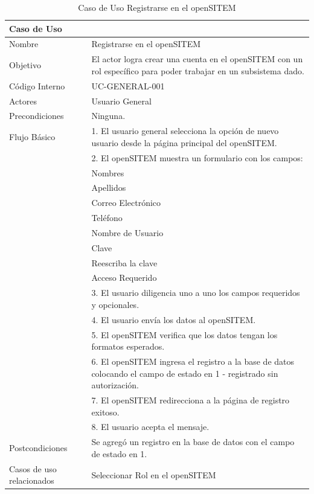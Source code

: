 \begin{table}
\begin{center}
\begin{tabular}{|l|p{10cm}|}
\hline
\textbf{Caso de Uso}&\\
\hline
Nombre & Registrarse en el openSITEM\\
\hline
Objetivo & El actor logra crear una cuenta en el openSITEM con un rol específico para poder trabajar en un subsistema dado.\\
\hline
Código Interno & UC-GENERAL-001 \\
\hline
Actores & Usuario General\\
\hline
Precondiciones & Ninguna.\\
\hline
Flujo Básico & 1. El usuario general selecciona la opción de nuevo usuario desde la página principal del openSITEM.\\
& 2. El openSITEM muestra un formulario con los campos:\\
& Nombres\\
& Apellidos\\
& Correo Electrónico\\
& Teléfono\\
& Nombre de Usuario\\
& Clave\\
& Reescriba la clave\\
& Acceso Requerido\\
& 3. El usuario diligencia uno a uno los campos requeridos y opcionales.\\
& 4. El usuario envía los datos al openSITEM.\\
& 5. El openSITEM verifica que los datos tengan los formatos esperados.\\
& 6. El openSITEM ingresa el registro a la base de datos colocando el campo de estado en 1 - registrado sin autorización.\\
& 7. El openSITEM redirecciona a la página de registro exitoso.\\
& 8. El usuario acepta el mensaje.\\
\hline
Postcondiciones & Se agregó un registro en la base de datos con el campo de estado en 1.\\
\hline
Casos de uso relacionados&Seleccionar Rol en el openSITEM\\
\hline
\end{tabular}
\caption{Caso de Uso Registrarse en el openSITEM}
\label{casouso} 
\end{center}
\end{table}

